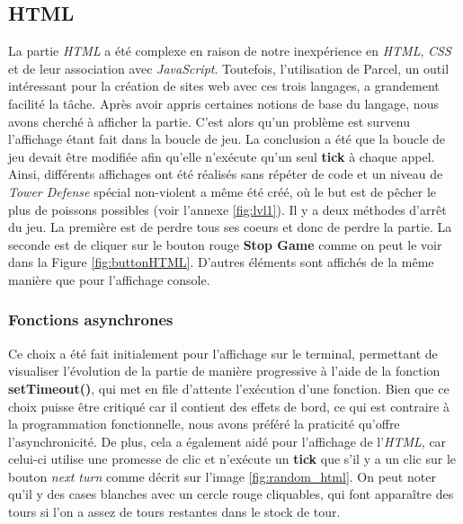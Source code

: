 \documentclass{article}
\begin{document}
\subsection{HTML}
   La partie \textit{HTML} a été complexe en raison de notre inexpérience en \textit{HTML}, \textit{CSS} et de leur association avec \textit{JavaScript}. Toutefois, l'utilisation de Parcel, un outil intéressant pour la création de sites web avec ces trois langages, a grandement facilité la tâche. Après avoir appris certaines notions de base du langage, nous avons cherché à afficher la partie. C'est alors qu'un problème est survenu l'affichage étant fait dans la boucle de jeu. La conclusion a été que la boucle de jeu devait être modifiée afin qu'elle n'exécute qu'un seul \textbf{tick} à chaque appel. Ainsi, différents affichages ont été réalisés sans répéter de code et un niveau de \textit{Tower Defense} spécial non-violent a même été créé, où le but est de pêcher le plus de poissons possibles (voir l'annexe \ref{fig:lvl1}). Il y a deux méthodes d'arrêt du jeu. La première est de perdre tous ses coeurs et donc de perdre la partie. La seconde est de cliquer sur le bouton rouge \textbf{Stop Game} comme on peut le voir dans la Figure \ref{fig:buttonHTML}. D'autres éléments sont affichés de la même manière que pour l'affichage console.

\subsubsection{Fonctions asynchrones}
    Ce choix a été fait initialement pour l'affichage sur le terminal, permettant de visualiser l'évolution de la partie de manière progressive à l'aide de la fonction \textbf{setTimeout()}, qui met en file d'attente l'exécution d'une fonction. Bien que ce choix puisse être critiqué car il contient des effets de bord, ce qui est contraire à la programmation fonctionnelle, nous avons préféré la praticité qu'offre l'asynchronicité. De plus, cela a également aidé pour l'affichage de l'\textit{HTML}, car celui-ci utilise une promesse de clic et n'exécute un \textbf{tick} que s'il y a un clic sur le bouton \textit{next turn} comme décrit sur l'image \ref{fig:random_html}. On peut noter qu'il y des cases blanches avec un cercle rouge cliquables, qui font apparaître des tours si l'on a assez de tours restantes dans le stock de tour.
\end{document}
